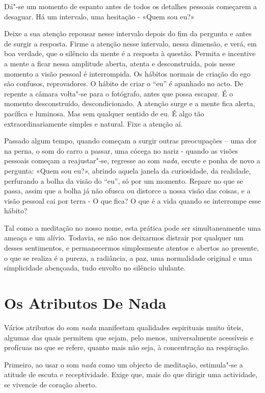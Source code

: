 Dá"-se um momento de espanto antes de todos os detalhes pessoais
começarem a desaguar. Há um intervalo, uma hesitação - «Quem sou eu?»

Deixe a sua atenção repousar nesse intervalo depois do fim da pergunta e
antes de surgir a resposta. Firme a atenção nesse intervalo, nessa
dimensão, e verá, em boa verdade, que o silêncio da mente é a resposta à
questão. Permita e incentive a mente a ficar nessa amplitude aberta,
atenta e desconstruída, pois nesse momento a visão pessoal é
interrompida. Os hábitos normais de criação do ego são confusos,
reprovadores. O hábito de criar o ``eu'' é apanhado no acto. De repente
a câmara volta"-se para o fotógrafo, antes que possa escapar. É o momento
desconstruído, descondicionado. A atenção surge e a mente fica alerta,
pacífica e luminosa. Mas sem qualquer sentido de eu. É algo tão
extraordinariamente simples e natural. Fixe a atenção aí.

Passado algum tempo, quando começam a surgir outras preocupações -- uma
dor na perna, o som do carro a passar, uma cócega no nariz - quando as
visões pessoais começam a reajustar"-se, regresse ao som \emph{nada},
escute e ponha de novo a pergunta: «Quem sou eu?», abrindo aquela janela
da curiosidade, da realidade, perfurando a bolha da visão do ``eu'', só
por um momento. Repare no que se passa, assim que a bolha já não ofusca
ou distorce a nossa visão das coisas, e a visão pessoal cai por terra -
O que fica? O que é a vida quando se interrompe esse hábito?

Tal como a meditação no nosso nome, esta prática pode ser
simultaneamente uma ameaça e um alívio. Todavia, se não nos deixarmos
distrair por qualquer um desses sentimentos, e permanecermos
simplesmente atentos e abertos ao presente, o que se realiza é a pureza,
a radiância, a paz, uma normalidade original e uma simplicidade
abençoada, tudo envolto no silêncio ululante.

\section{Os Atributos De Nada}

Vários atributos do som \emph{nada} manifestam qualidades espirituais
muito úteis, algumas das quais permitem que sejam, pelo menos,
universalmente acessíveis e profícuas no que se refere, quanto mais não
seja, à concentração na respiração.

Primeiro, ao usar o som \emph{nada} como um objecto de meditação,
estimula"-se a atitude de escuta e receptividade. Exige que, mais do que
dirigir uma actividade, se vivencie de coração aberto.


